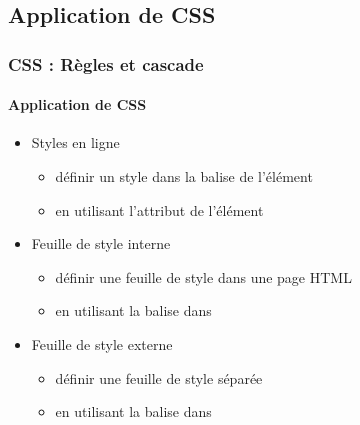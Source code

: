 \documentclass[xcolor=table]{beamer}
\begin{document}
\subsection{Application de CSS}

\begin{frame}[fragile]
\frametitle{CSS : Règles et cascade}
\framesubtitle{Application de CSS}

\begin{itemize}
	\item Styles en ligne
	\begin{itemize}
		\item définir un style dans la balise de l'élément
		\item en utilisant l'attribut  de l'élément
	\end{itemize}
	\item Feuille de style interne
	\begin{itemize}
		\item définir une feuille de style dans une page HTML
		\item en utilisant la balise  dans 
	\end{itemize}
	\item Feuille de style externe
	\begin{itemize}
		\item définir une feuille de style séparée
		\item en utilisant la balise  dans 
	\end{itemize}
\end{itemize}

\end{frame}
\end{document}
